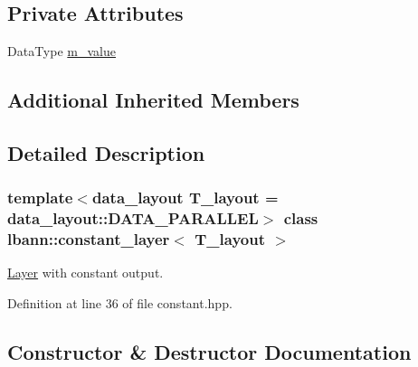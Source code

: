 \subsection*{Private Attributes}
\begin{DoxyCompactItemize}
\item 
Data\+Type \hyperlink{classlbann_1_1constant__layer_a8cdb9c854777cc29f1cf1f60da64ef4e}{m\+\_\+value}
\end{DoxyCompactItemize}
\subsection*{Additional Inherited Members}


\subsection{Detailed Description}
\subsubsection*{template$<$data\+\_\+layout T\+\_\+layout = data\+\_\+layout\+::\+D\+A\+T\+A\+\_\+\+P\+A\+R\+A\+L\+L\+EL$>$\newline
class lbann\+::constant\+\_\+layer$<$ T\+\_\+layout $>$}

\hyperlink{classlbann_1_1Layer}{Layer} with constant output. 

Definition at line 36 of file constant.\+hpp.



\subsection{Constructor \& Destructor Documentation}
\mbox{\label{classlbann_1_1constant__layer_a00b24316ac4ac313feb751cb00d850fc}} 
